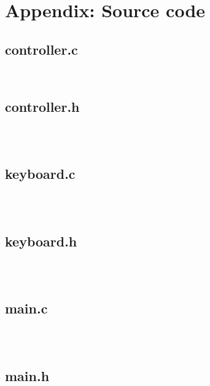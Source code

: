 \documentclass{article}
\begin{document}
\section*{Appendix: Source code}

\subsection*{controller.c}

\begin{verbatim}


\end{verbatim}

\subsection*{controller.h}

\begin{verbatim}



\end{verbatim}

\subsection*{keyboard.c}

\begin{verbatim}



\end{verbatim}

\subsection*{keyboard.h}

\begin{verbatim}



\end{verbatim}

\subsection*{main.c}

\begin{verbatim}



\end{verbatim}

\subsection*{main.h}
\end{document}
